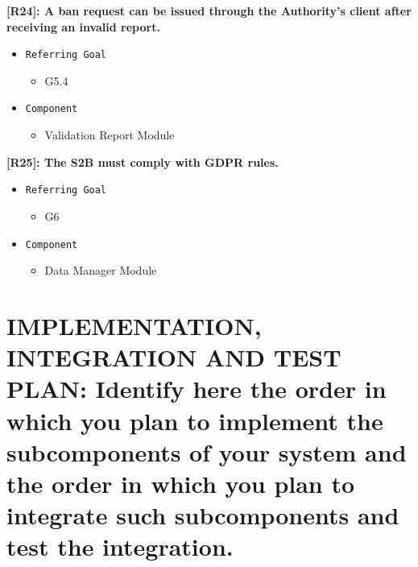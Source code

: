 \documentclass[12pt,a4paper]{article}
\begin{document}
\textbf{[R24]: A ban request can be issued through the Authority's client after receiving an invalid report.}
\begin{itemize}
	\item \texttt{Referring Goal}
	\begin{itemize}
		\item G5.4
	\end{itemize}
	\item \texttt{Component}
	\begin{itemize}
		\item Validation Report Module 
	\end{itemize}
\end{itemize}
\textbf{[R25]: The S2B must comply with GDPR rules.}
\begin{itemize}
	\item \texttt{Referring Goal}
	\begin{itemize}
		\item G6
	\end{itemize}
	\item \texttt{Component}
	\begin{itemize}
		\item Data Manager Module 
	\end{itemize}
\end{itemize}
\section{IMPLEMENTATION, INTEGRATION AND TEST PLAN: Identify here the order in which you plan to implement the subcomponents of your system and the order in which you plan to integrate such subcomponents and test the integration.}
\end{document}
